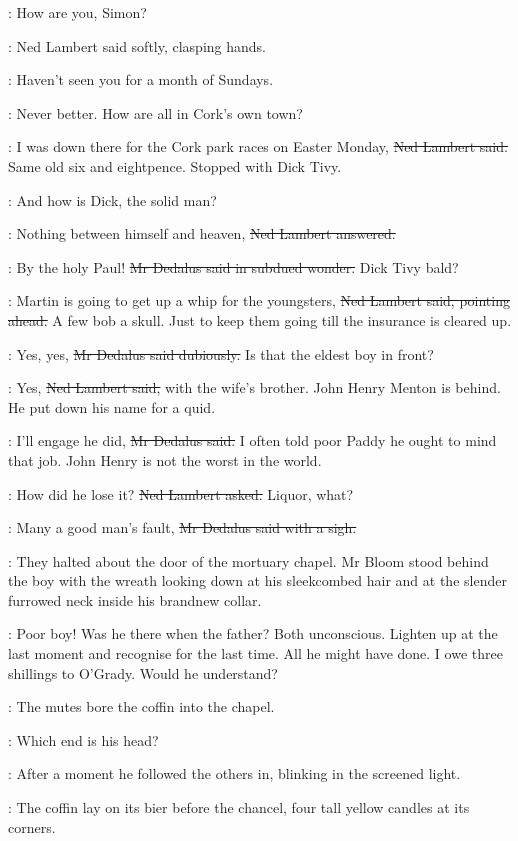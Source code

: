 \lambert:
How are you, Simon?

:
Ned Lambert said softly,
clasping hands.

\lambert:
Haven't seen you for a month of Sundays.

\simon:
Never better.
How are all in Cork's own town?

\lambert:
I was down there for the Cork park races on Easter Monday,
\sout{Ned Lambert said.}
Same old six and eightpence.
Stopped with Dick Tivy.

\simon:
And how is Dick, the solid man?

\lambert:
Nothing between himself and heaven,
\sout{Ned Lambert answered.}

\simon:
By the holy Paul!
\sout{Mr Dedalus said in subdued wonder.}
Dick Tivy bald?

\lambert:
Martin is going to get up a whip for the youngsters,
\sout{Ned Lambert said, pointing ahead.}
A few bob a skull.
Just to keep them going till the insurance is cleared up.

\simon:
Yes, yes,
\sout{Mr Dedalus said dubiously.}
Is that the eldest boy in front?

\lambert:
Yes,
\sout{Ned Lambert said,}
with the wife's brother.
John Henry Menton is behind.
He put down his name for a quid.

\simon:
I'll engage he did,
\sout{Mr Dedalus said.}
I often told poor Paddy he ought to mind that job.
John Henry is not the worst in the world.

\lambert:
How did he lose it?
\sout{Ned Lambert asked.}
Liquor, what?

\simon:
Many a good man's fault,
\sout{Mr Dedalus said with a sigh.}

:
They halted about the door of the mortuary chapel.
Mr Bloom stood behind the boy with the wreath
looking down at his sleekcombed hair and
at the slender furrowed neck inside his brandnew collar.

\BloomInt:
Poor boy!
Was he there when the father?
Both unconscious.
Lighten up at the last moment and recognise for the last time.
All he might have done.
I owe three shillings to O'Grady.
Would he understand?

:
The mutes bore the coffin into the chapel.

\BloomInt:
Which end is his head?

:
After a moment he followed the others in,
blinking in the screened light.

:
The coffin lay on its bier before the chancel,
four tall yellow candles at its corners.

